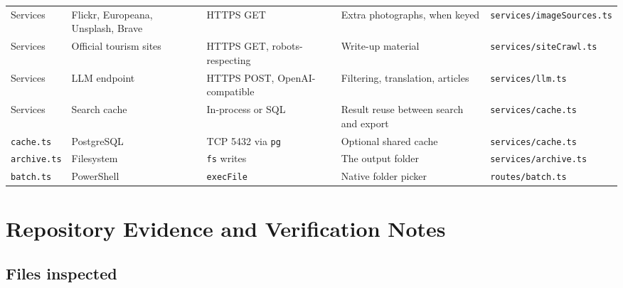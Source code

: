 \documentclass[11pt,a4paper]{report}
\newcommand{\code}[1]{\texttt{\small #1}}
\DeclareRobustCommand{\file}[1]{{\small\nolinkurl{#1}}}
\begin{document}
\begin{longtable}{@{}>{\raggedright\arraybackslash}p{3.0cm}>{\raggedright\arraybackslash}p{3.0cm}>{\raggedright\arraybackslash}p{2.6cm}>{\raggedright\arraybackslash}p{3.0cm}>{\raggedright\arraybackslash}p{3.2cm}@{}}
Services & Flickr, Europeana, Unsplash, Brave & HTTPS GET & Extra photographs, when keyed & \file{services/imageSources.ts}\\
Services & Official tourism sites & HTTPS GET, robots-respecting & Write-up material & \file{services/siteCrawl.ts}\\
Services & LLM endpoint & HTTPS POST, OpenAI-compatible & Filtering, translation, articles & \file{services/llm.ts}\\
Services & Search cache & In-process or SQL & Result reuse between search and export & \file{services/cache.ts}\\
\code{cache.ts} & PostgreSQL & TCP 5432 via \code{pg} & Optional shared cache & \file{services/cache.ts}\\
\code{archive.ts} & Filesystem & \code{fs} writes & The output folder & \file{services/archive.ts}\\
\code{batch.ts} & PowerShell & \code{execFile} & Native folder picker & \file{routes/batch.ts}\\
\end{longtable}

\chapter{Repository Evidence and Verification Notes}
\label{sec:evidence}

\section{Files inspected}
\end{document}
